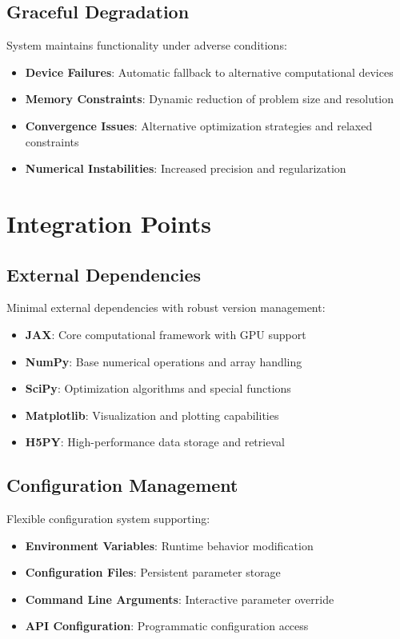 \documentclass{article}
\begin{document}
\subsection{Graceful Degradation}

System maintains functionality under adverse conditions:

\begin{itemize}
\item \textbf{Device Failures}: Automatic fallback to alternative computational devices
\item \textbf{Memory Constraints}: Dynamic reduction of problem size and resolution
\item \textbf{Convergence Issues}: Alternative optimization strategies and relaxed constraints
\item \textbf{Numerical Instabilities}: Increased precision and regularization
\end{itemize}

\section{Integration Points}

\subsection{External Dependencies}

Minimal external dependencies with robust version management:

\begin{itemize}
\item \textbf{JAX}: Core computational framework with GPU support
\item \textbf{NumPy}: Base numerical operations and array handling
\item \textbf{SciPy}: Optimization algorithms and special functions
\item \textbf{Matplotlib}: Visualization and plotting capabilities
\item \textbf{H5PY}: High-performance data storage and retrieval
\end{itemize}

\subsection{Configuration Management}

Flexible configuration system supporting:

\begin{itemize}
\item \textbf{Environment Variables}: Runtime behavior modification
\item \textbf{Configuration Files}: Persistent parameter storage
\item \textbf{Command Line Arguments}: Interactive parameter override
\item \textbf{API Configuration}: Programmatic configuration access
\end{itemize}
\end{document}
